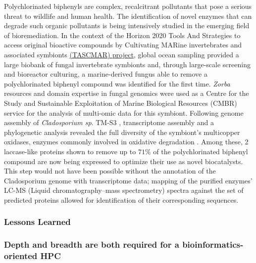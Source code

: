    Polychlorinated biphenyls are complex, recalcitrant pollutants that pose a serious threat to wildlife and human health. 
   The identification of novel enzymes that can degrade such organic pollutants is being intensively studied in the emerging field of bioremediation. 
   In the context of the Horizon 2020 Tools And Strategies to access original bioactive compounds by Cultivating MARine invertebrates and associated symbionts \href{http://www.tascmar.eu/}{(TASCMAR) project}, global ocean sampling provided a large biobank of fungal invertebrate symbionts and, through large-scale screening and bioreactor culturing, a marine-derived fungus able to remove a polychlorinated biphenyl compound was identified for the first time. 
   \textit{Zorba} resources and domain expertise in fungal genomics were used as a Centre for the Study and Sustainable Exploitation of Marine Biological Resources (CMBR) service for the analysis of multi-omic data for this symbiont. Following genome assembly of \textit{Cladosporium sp}. 
   TM-S3 \citep{gioti2020draft}, transcriptome assembly and a phylogenetic analysis revealed the full diversity of the symbiont's multicopper oxidases, enzymes commonly involved in oxidative degradation \citep{nikolaivits2021functional}. 
   Among these, 2 laccase-like proteins shown to remove up to $71\%$ of the polychlorinated biphenyl compound are now being expressed to optimize their use as novel biocatalysts. 
   This step would not have been possible without the annotation of the Cladosporium genome with transcriptome data; 
   mapping of the purified enzymes' LC-MS (Liquid chromatography–mass spectrometry) spectra against the set of predicted proteins allowed for identification of their corresponding sequences.



   \subsubsection*{Lessons Learned}

   \subsubsection*{Depth and breadth are both required for a bioinformatics-oriented HPC}

